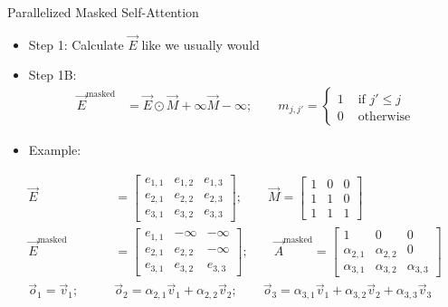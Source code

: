\begin{vbframe}{Parallelized Masked Self-Attention}

\vfill

\begin{itemize}
\item Step 1: Calculate $\vec E$ like we usually would
\item Step 1B:
$$
\begin{aligned}
\vec E^\mathrm{masked} & = \vec E \odot \vec M + \infty\vec M-\infty; \qquad m_{j,j'} = \begin{cases} 1 & \text{ if } j' \leq j \\ 0 & \text{ otherwise} \end{cases}
\end{aligned}
$$
\item Example:
\end{itemize}
$$
\begin{aligned}
\vec E & = \begin{bmatrix} e_{1,1} & e_{1,2} & e_{1,3} \\ e_{2,1} & e_{2,2} & e_{2,3} \\ e_{3,1} & e_{3,2} & e_{3,3} \end{bmatrix}; \qquad \vec M = \begin{bmatrix} 1 & 0 & 0 \\ 1 & 1 & 0 \\ 1 & 1 & 1 \end{bmatrix} \\
\vec E^\mathrm{masked} & = \begin{bmatrix} e_{1,1} & -\infty & -\infty \\ e_{2,1} & e_{2,2} & -\infty \\ e_{3,1} & e_{3,2} & e_{3,3} \end{bmatrix} ; \qquad \vec A^\mathrm{masked} = \begin{bmatrix} 1 & 0 & 0 \\ \alpha_{2,1} & \alpha_{2,2} & 0 \\ \alpha_{3,1} & \alpha_{3,2} & \alpha_{3,3} \end{bmatrix} \\
\vec o_1 = \vec v_1; \qquad & \vec o_2 = \alpha_{2,1} \vec v_1 + \alpha_{2,2} \vec v_2; \qquad \vec o_3 = \alpha_{3,1} \vec v_1 + \alpha_{3,2} \vec v_2 + \alpha_{3,3} \vec v_3
\end{aligned}
$$

\vfill

\end{vbframe}

